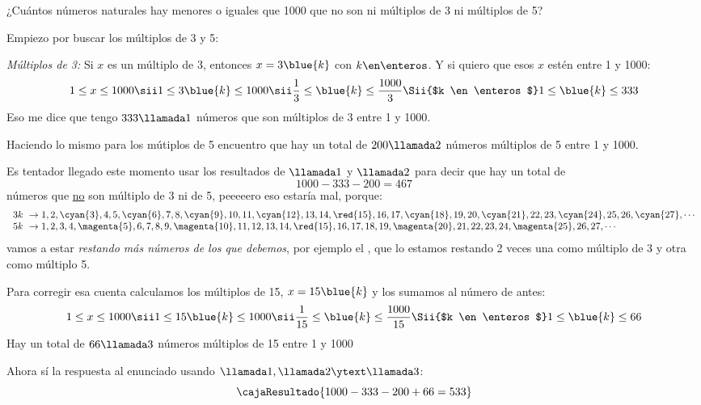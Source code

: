 \begin{enunciado}{\ejercicio}
  ¿Cuántos números naturales hay menores o iguales que 1000 que no son ni múltiplos
  de 3 ni múltiplos de 5?
\end{enunciado}

Empiezo por buscar los múltiplos de 3 y 5:

\textit{Múltiplos de 3:} Si $x$ es un múltiplo de 3, entonces $x = 3\blue{k}$ con $k \en \enteros$. Y si quiero que esos $x$ estén entre 1 y 1000:
$$
  1\leq x \leq 1000
  \sii
  1\leq 3\blue{k} \leq 1000
  \sii
  \frac{1}{3}\leq \blue{k} \leq \frac{1000}{3}
  \Sii{$k \en \enteros$}
  1 \leq \blue{k} \leq 333
$$
Eso me dice que tengo $333\llamada1$ números que son múltiplos de 3 entre 1 y 1000.

Haciendo lo mismo para los mútiplos de 5 encuentro que hay un total de $200\llamada2$ números múltiplos de 5 entre 1 y 1000.

Es tentador llegado este momento usar los resultados de $\llamada1$ y $\llamada2$ para decir que hay un total de
$$
  1000 - 333 - 200 = 467
$$
números que \underline{no} son múltiplo de 3 ni de 5, peeeeero eso estaría mal, porque:
$$
  \begin{array}{l}
    \text{3$k$ } \to 1,2,\cyan{3},4,5,\cyan{6},7,8,\cyan{9},10,11,\cyan{12},13,14,\red{15},16,17,\cyan{18},19,20,\cyan{21},22,23,\cyan{24},25,26,\cyan{27},\cdots \\
    \text{5$k$ } \to 1,2,3,4,\magenta{5},6,7,8,9,\magenta{10},11,12,13,14,\red{15},16,17,18,19,\magenta{20},21,22,23,24,\magenta{25},26,27,\cdots                                \\
  \end{array}
$$
vamos a estar \textit{restando más números de los que debemos}, por ejemplo el , que lo estamos restando 2 veces\red{!} una
como múltiplo de 3 y otra como múltiplo 5.

Para corregir esa cuenta calculamos los múltiplos de 15, $x = 15\blue{k}$ y los sumamos al número de antes:
$$
  1\leq x \leq 1000
  \sii
  1\leq 15\blue{k} \leq 1000
  \sii
  \frac{1}{15}\leq \blue{k} \leq \frac{1000}{15}
  \Sii{$k \en \enteros$}
  1 \leq \blue{k} \leq 66
$$
Hay un total de $66 \llamada3$ números múltiplos de 15 entre 1 y 1000

Ahora sí la respuesta al enunciado usando $\llamada1, \llamada2 \ytext \llamada3$:
$$
  \cajaResultado{
    1000 - 333 - 200 + 66 = 533
  }
$$

\bigskip


